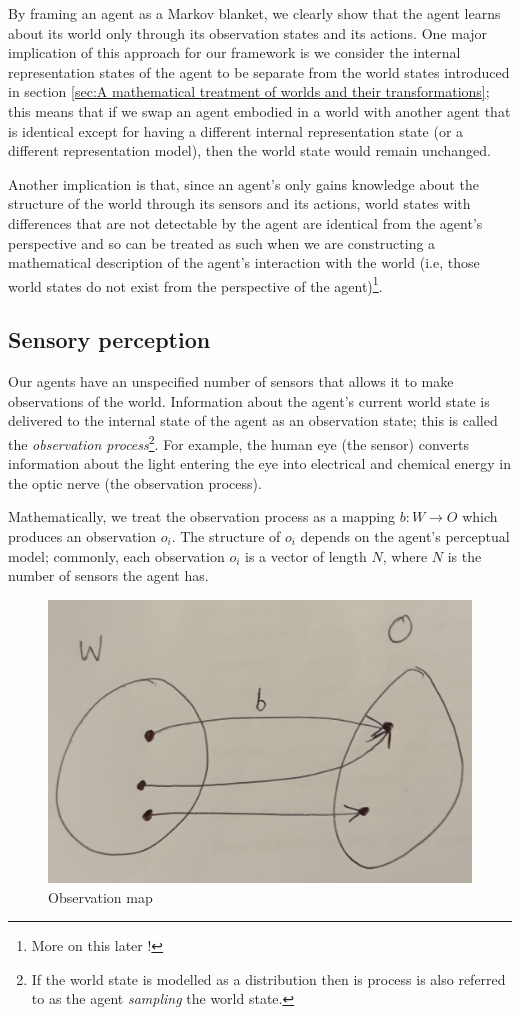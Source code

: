 By framing an agent as a Markov blanket, we clearly show that the agent learns about its world only through its observation states and its actions.
One major implication of this approach for our framework is we consider the internal representation states of the agent to be separate from the world states introduced in section \ref{sec:A mathematical treatment of worlds and their transformations}; this means that if we swap an agent embodied in a world with another agent that is identical except for having a different internal representation state (or a different representation model), then the world state would remain unchanged.

Another implication is that, since an agent's only gains knowledge about the structure of the world through its sensors and its actions, world states with differences that are not detectable by the agent are identical from the agent's perspective and so can be treated as such when we are constructing a mathematical description of the agent's interaction with the world (i.e, those world states do not exist from the perspective of the agent)\footnote{More on this later !}.

\subsection{Sensory perception}

Our agents have an unspecified number of sensors that allows it to make observations of the world.
Information about the agent's current world state is delivered to the internal state of the agent as an observation state; this is called the \emph{observation process}\footnote{If the world state is modelled as a distribution then is process is also referred to as the agent \emph{sampling} the world state.}.
For example, the human eye (the sensor) converts information about the light entering the eye into
electrical and chemical energy in the optic nerve (the observation process).

Mathematically, we treat the observation process as a mapping $b: W \to O$ which produces an observation $o_{i}$.
The structure of $o_{i}$ depends on the agent's perceptual model; commonly, each observation $o_{i}$ is a vector of length $N$, where $N$ is the number of sensors the agent has.

\begin{figure}
    \centering
    \includegraphics[width=0.5\linewidth]{2MathematicalFramework/InitialFramework/Images/observation_process_W_to_O.jpeg}
    \caption{
        Observation map
    }
    \label{fig:observation_process_W_to_O}
\end{figure}

